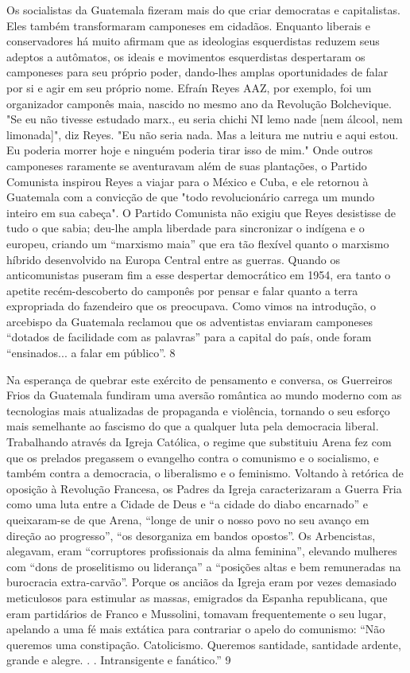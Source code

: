 Os socialistas da Guatemala fizeram mais do que criar democratas e capitalistas. Eles também transformaram camponeses em cidadãos. Enquanto liberais e conservadores há muito afirmam que as ideologias esquerdistas reduzem seus adeptos a autômatos, os ideais e movimentos esquerdistas despertaram os camponeses para seu próprio poder, dando-lhes amplas oportunidades de falar por si e agir em seu próprio nome. Efraín Reyes AAZ, por exemplo, foi um organizador camponês maia, nascido no mesmo ano da Revolução Bolchevique. "Se eu não tivesse estudado marx., eu seria chichi NI lemo nade [nem álcool, nem limonada]", diz Reyes. "Eu não seria nada. Mas a leitura me nutriu e aqui estou. Eu poderia morrer hoje e ninguém poderia tirar isso de mim." Onde outros camponeses raramente se aventuravam além de suas plantações, o Partido Comunista inspirou Reyes a viajar para o México e Cuba, e ele retornou à Guatemala com a convicção de que "todo revolucionário carrega um mundo inteiro em sua cabeça". O Partido Comunista não exigiu que Reyes desistisse de tudo o que sabia; deu-lhe ampla liberdade para sincronizar o indígena e o europeu, criando um “marxismo maia” que era tão flexível quanto o marxismo híbrido desenvolvido na Europa Central entre as guerras. Quando os anticomunistas puseram fim a esse despertar democrático em 1954, era tanto o apetite recém-descoberto do camponês por pensar e falar quanto a terra expropriada do fazendeiro que os preocupava. Como vimos na introdução, o arcebispo da Guatemala reclamou que os adventistas enviaram camponeses “dotados de facilidade com as palavras” para a capital do país, onde foram “ensinados... a falar em público”.
 {\color{blue} 8}  

 
\par
 
Na esperança de quebrar este exército de pensamento e conversa, os Guerreiros Frios da Guatemala fundiram uma aversão romântica ao mundo moderno com as tecnologias mais atualizadas de propaganda e violência, tornando o seu esforço mais semelhante ao fascismo do que a qualquer luta pela democracia liberal. Trabalhando através da Igreja Católica, o regime que substituiu Arena fez com que os prelados pregassem o evangelho contra o comunismo e o socialismo, e também contra a democracia, o liberalismo e o feminismo. Voltando à retórica de oposição à Revolução Francesa, os Padres da Igreja caracterizaram a Guerra Fria como uma luta entre a Cidade de Deus e “a cidade do diabo encarnado” e queixaram-se de que Arena, “longe de unir o nosso povo no seu avanço em direção ao progresso”, “os desorganiza em bandos opostos”. Os Arbencistas, alegavam, eram “corruptores profissionais da alma feminina”, elevando mulheres com “dons de proselitismo ou liderança” a “posições altas e bem remuneradas na burocracia extra-carvão”. Porque os anciãos da Igreja eram por vezes demasiado meticulosos para estimular as massas, emigrados da Espanha republicana, que eram partidários de Franco e Mussolini, tomavam frequentemente o seu lugar, apelando a uma fé mais extática para contrariar o apelo do comunismo: “Não queremos uma constipação. Catolicismo. Queremos santidade, santidade ardente, grande e alegre. . . Intransigente e fanático.”
 {\color{blue} 9}  

